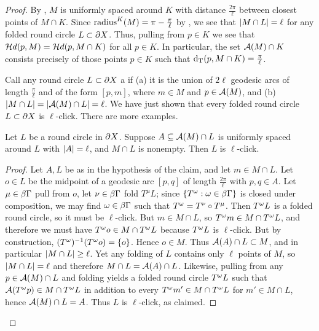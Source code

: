 \documentclass{amsart}
\renewcommand{\setp}[2]{\left\{#1 : #2\right\}}
\begin{document}
\begin{proof}
By , $M$ is uniformly spaced around $K$ with distance $\frac{2\pi}{\ell}$ between closest points of $M \cap K$.  Since $\operatorname{radius}^K (M) = \pi - \frac{\pi}{\ell}$ by , we see that $\left| M \cap L \right| = \ell$ for any folded round circle $L \subset \partial X$.  Thus, pulling from $p \in K$ we see that
\(\mathcal{H}d(p, M) = \mathcal{H}d(p, M \cap K)\)
for all $p \in K$.  In particular, the set $\operatorname{\mathcal A}(M) \cap K$ consists precisely of those points $p \in K$ such that $\operatorname{d_T}(p, M \cap K) = \frac{\pi}{\ell}$.

Call any round circle $L \subset \partial X$ a  if (a) it is the union of $2\ell$ geodesic arcs of length $\frac{\pi}{\ell}$ and of the form $[p,m]$, where $m \in M$ and $p \in \operatorname{\mathcal A}(M)$, and (b) $\left| M \cap L \right| = \left| \operatorname{\mathcal A}(M) \cap L \right| = \ell$.  We have just shown that every folded round circle $L \subset \partial X$ is $\ell$-click.
There are more examples.

\begin{claim}		\label{A(M) implies M}
Let $L$ be a round circle in $\partial X$.
Suppose $A \subseteq \operatorname{\mathcal A}(M) \cap L$ is uniformly spaced around $L$ with $\left| A \right| = \ell$, and $M \cap L$ is nonempty.
Then $L$ is $\ell$-click. \end{claim}

\begin{proof}
Let $A,L$ be as in the hypothesis of the claim, and let $m \in M \cap L$.
Let $o \in L$ be the midpoint of a geodesic arc $[p,q]$ of length $\frac{2\pi}{\ell}$ with $p,q \in A$.
Let $\mu \in \beta \Gamma$ pull from $o$, let $\nu \in \beta \Gamma$ fold $T^{\mu} L$; since $\setp{T^{\w}}{\w \in \BG}$ is closed under composition, we may find $\omega \in \beta \Gamma$ such that $T^\omega = T^\nu \circ T^\mu$.
Then $T^{\omega} L$ is a folded round circle, so it must be $\ell$-click.
But $m \in M \cap L$, so $T^{\omega} m \in M \cap T^{\omega} L$, and therefore we must have $T^{\omega} o \in M \cap T^{\omega} L$ because $T^{\omega} L$ is $\ell$-click.
But by construction, $(T^{\omega})^{-1} (T^{\omega} o) = \left\{o\right\}$.
Hence $o \in M$.
Thus $\operatorname{\mathcal A}(A) \cap L \subset M$, and in particular $\left| M \cap L \right| \ge \ell$.
Yet any folding of $L$ contains only $\ell$ points of $M$, so $\left| M \cap L \right| = \ell$ and therefore $M \cap L = \operatorname{\mathcal A}(A) \cap L$.
Likewise, pulling from any $p \in \operatorname{\mathcal A}(M) \cap L$ and folding yields a folded round circle $T^{\omega} L$ such that $\operatorname{\mathcal A}(T^{\omega} p) \in M \cap T^{\omega} L$ in addition to every $T^{\omega} m' \in M \cap T^{\omega} L$ for $m' \in M \cap L$, hence $\operatorname{\mathcal A}(M) \cap L = A$.
Thus $L$ is $\ell$-click, as claimed.
\end{proof}


\end{proof}
\end{document}
